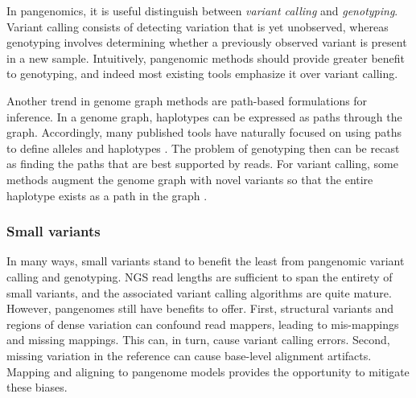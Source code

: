 In pangenomics, it is useful distinguish between \emph{variant calling} and \emph{genotyping}.
Variant calling consists of detecting variation that is yet unobserved, whereas genotyping involves determining whether a previously observed variant is present in a new sample.
Intuitively, pangenomic methods should provide greater benefit to genotyping, and indeed most existing tools emphasize it over variant calling.

Another trend in genome graph methods are path-based formulations for inference.
In a genome graph, haplotypes can be expressed as paths through the graph.
Accordingly, many published tools have naturally focused on using paths to define alleles and haplotypes \cite{dilthey2015improved, sibbesen2018accurate,lee2018kourami,hickey2019genotyping,dolzhenko2019expansionhunter}.
The problem of genotyping then can be recast as finding the paths that are best supported by reads.
For variant calling, some methods augment the genome graph with novel variants so that the entire haplotype exists as a path in the graph \cite{sibbesen2018accurate,lee2018kourami,hickey2019genotyping}.

\subsubsection{Small variants}

In many ways, small variants stand to benefit the least from pangenomic variant calling and genotyping.
NGS read lengths are sufficient to span the entirety of small variants, and the associated variant calling algorithms are quite mature.
However, pangenomes still have benefits to offer.
First, structural variants and regions of dense variation can confound read mappers, leading to mis-mappings and missing mappings.
This can, in turn, cause variant calling errors.
Second, missing variation in the reference can cause base-level alignment artifacts.
Mapping and aligning to pangenome models provides the opportunity to mitigate these biases.

